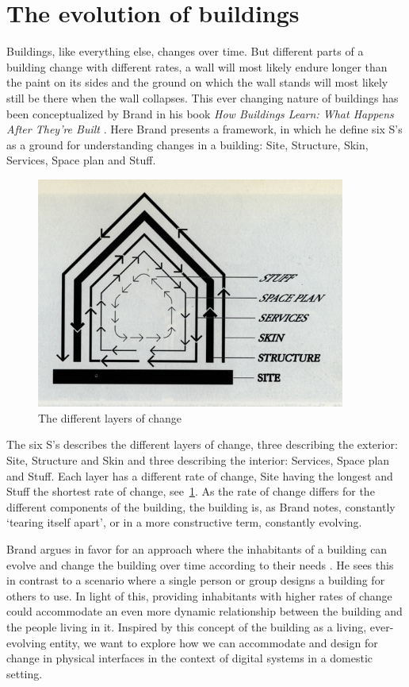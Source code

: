 \section{The evolution of buildings}
Buildings, like everything else, changes over time.
But different parts of a building change with different rates, a wall will most likely endure longer than the paint on its sides and the ground on which the wall stands will most likely still be there when the wall collapses.
This ever changing nature of buildings has been conceptualized by Brand in his book \emph{How Buildings Learn: What Happens After They're Built} \citet{brand1995buildings} \citep{brand1995buildings}.
Here Brand presents a framework, in which he define six S's as a ground for understanding changes in a building: Site, Structure, Skin, Services, Space plan and Stuff.

\begin{figure}[hb]
	\centering
  		\includegraphics[width=4in]{pictures/brand-diagram}
	\caption[The different layers of change, taken from \cite{brand1995buildings}]
   {The different layers of change \cite{brand1995buildings}}
   \label{brand-diagram}
\end{figure}

The six S's describes the different layers of change, three describing the exterior: Site, Structure and Skin and three describing the interior: Services, Space plan and Stuff.
Each layer has a different rate of change, Site having the longest and Stuff the shortest rate of change, see~\ref{brand-diagram}. As the rate of change differs for the different components of the building, the building is, as Brand notes, constantly `tearing itself apart', or in a more constructive term, constantly evolving.

Brand argues in favor for an approach where the inhabitants of a building can evolve and change the building over time according to their needs \cite{brandBBCvideo}.
He sees this in contrast to a scenario where a single person or group designs a building for others to use.
In light of this, providing inhabitants with higher rates of change could accommodate an even more dynamic relationship between the building and the people living in it.
Inspired by this concept of the building as a living, ever-evolving entity, we want to explore how we can accommodate and design for change in physical interfaces in the context of digital systems in a domestic setting.
 
